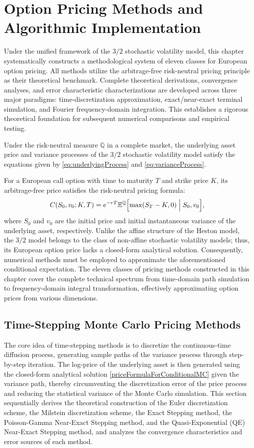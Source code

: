 \chapter{Option Pricing Methods and Algorithmic Implementation}

Under the unified framework of the $3/2$ stochastic volatility model, this chapter systematically constructs a methodological system of eleven classes for European option pricing. All methods utilize the arbitrage-free risk-neutral pricing principle as their theoretical benchmark. Complete theoretical derivations, convergence analyses, and error characteristic characterizations are developed across three major paradigms: time-discretization approximation, exact/near-exact terminal simulation, and Fourier frequency-domain integration. This establishes a rigorous theoretical foundation for subsequent numerical comparisons and empirical testing.

Under the risk-neutral measure $\mathbb{Q}$ in a complete market, the underlying asset price and variance processes of the $3/2$ stochastic volatility model satisfy the equations given by \eqref{eq:underlyingProcess} and \eqref{eq:varianceProcess}.

For a European call option with time to maturity $T$ and strike price $K$, its arbitrage-free price satisfies the risk-neutral pricing formula:
\begin{equation}
  C(S_0,v_0;K,T) = e^{-rT}\mathbb{E}^{\mathbb{Q}}\Bigl[\max(S_T-K,0)\Bigm| S_0,v_0\Bigr],
\end{equation}
where $S_0$ and $v_0$ are the initial price and initial instantaneous variance of the underlying asset, respectively. Unlike the affine structure of the Heston model, the $3/2$ model belongs to the class of non-affine stochastic volatility models; thus, its European option price lacks a closed-form analytical solution. Consequently, numerical methods must be employed to approximate the aforementioned conditional expectation. The eleven classes of pricing methods constructed in this chapter cover the complete technical spectrum from time-domain path simulation to frequency-domain integral transformation, effectively approximating option prices from various dimensions.

\section{Time-Stepping Monte Carlo Pricing Methods}
The core idea of time-stepping methods is to discretize the continuous-time diffusion process, generating sample paths of the variance process through step-by-step iteration. The log-price of the underlying asset is then generated using the closed-form analytical solution \eqref{priceFormulaForConditionalMC} given the variance path, thereby circumventing the discretization error of the price process and reducing the statistical variance of the Monte Carlo simulation. This section sequentially derives the theoretical construction of the Euler discretization scheme, the Milstein discretization scheme, the Exact Stepping method, the Poisson-Gamma Near-Exact Stepping method, and the Quasi-Exponential (QE) Near-Exact Stepping method, and analyzes the convergence characteristics and error sources of each method.

